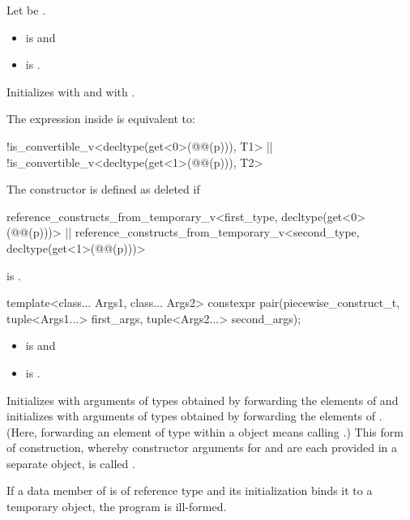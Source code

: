 \begin{itemdescr}
\pnum
Let  be .

\pnum
\constraints
\begin{itemize}
\item
{}
is  and
\item
{}
is .
\end{itemize}

\pnum
\effects
Initializes  with  and
 with .

\pnum
\remarks
The expression inside  is equivalent to:
\begin{codeblock}
!is_convertible_v<decltype(get<0>(@@(p))), T1> ||
!is_convertible_v<decltype(get<1>(@@(p))), T2>
\end{codeblock}
The constructor is defined as deleted if
\begin{codeblock}
reference_constructs_from_temporary_v<first_type, decltype(get<0>(@@(p)))> ||
reference_constructs_from_temporary_v<second_type, decltype(get<1>(@@(p)))>
\end{codeblock}
is .
\end{itemdescr}

%
\begin{itemdecl}
template<class... Args1, class... Args2>
  constexpr pair(piecewise_construct_t,
                 tuple<Args1...> first_args, tuple<Args2...> second_args);
\end{itemdecl}

\begin{itemdescr}
\pnum
\mandates
\begin{itemize}
\item {} is  and
\item {} is .
\end{itemize}

\pnum
\effects
Initializes  with arguments of types
 obtained by forwarding the elements of 
and initializes  with arguments of types 
obtained by forwarding the elements of . (Here, forwarding
an element  of type  within a  object means calling
.) This form of construction, whereby constructor
arguments for  and  are each provided in a separate
 object, is called .
\begin{note}
If a data member of  is of reference type and
its initialization binds it to a temporary object,
the program is ill-formed.
\end{note}
\end{itemdescr}

